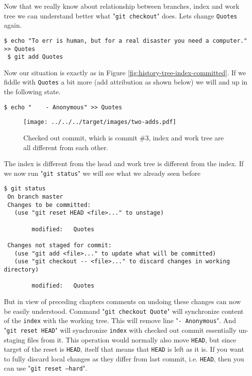 \documentclass{article}
\theoremstyle{definition}
\begin{document}
        Now that we really know about relationship between branches, index and work tree we can understand better
        what "\texttt{git checkout}" does. Lets change \texttt{Quotes} again.
        \begin{Verbatim}[frame=single]
 $ echo "To err is human, but for a real disaster you need a computer." >> Quotes
 $ git add Quotes
        \end{Verbatim}
        Now our situation is exactly as in Figure \ref{fig:history-tree-index-committed}. If we fiddle
        with \texttt{Quotes} a bit more (add attribution as shown below) we will and up in the following state.
        \begin{Verbatim}[frame=single]
 $ echo "    - Anonymous" >> Quotes
        \end{Verbatim}

        \begin{figure}[h]
        \texttt{[image: ../../../target/images/two-adds.pdf]}
        \caption{Checked out commit, which is commit \#3, index and work tree are all different from each other.\label{fig:two-adds}}
        \end{figure}

        \noindent The index is different from the head and work tree is different from the index. If we now run "\texttt{git status}" we will see what we already seen before

        \begin{Verbatim}[frame=single]
 $ git status
 On branch master
 Changes to be committed:
   (use "git reset HEAD <file>..." to unstage)

        modified:   Quotes

 Changes not staged for commit:
   (use "git add <file>..." to update what will be committed)
   (use "git checkout -- <file>..." to discard changes in working directory)

        modified:   Quotes
        \end{Verbatim}
        But in view of preceding chapters comments on undoing these changes can now be easily understood. Command
        "\texttt{git checkout Quote}" will synchronize content of the \texttt{index} with the working tree. This will
        remove line "\texttt{- Anonymous}". And "\texttt{git reset HEAD}" will synchronize \texttt{index} with checked
        out commit essentially un-staging files from it. This operation would normally also move \texttt{HEAD}, but
        since target of the reset is \texttt{HEAD}, itself that means that \texttt{HEAD} is left as it is. If you want
        to fully discard local changes as they differ from last commit, i.e. \texttt{HEAD}, then you can
        use "\texttt{git reset --hard}".
\end{document}
